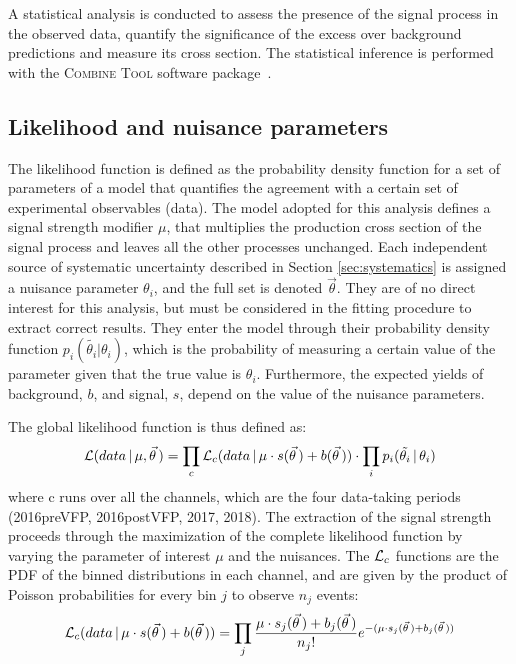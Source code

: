 \label{sec:statistical_analysis}
A statistical analysis is conducted to assess the presence of the signal process in the observed data,
quantify the significance of the excess over background predictions and measure its cross section.
The statistical inference is performed with the \textsc{Combine Tool} software package~\cite{CMS-NOTE-2011-005}.

\subsection{Likelihood and nuisance parameters}
The likelihood function is defined as the probability density function for a set of parameters of a model
that quantifies the agreement with a certain set of experimental observables (data).
The model adopted for this analysis defines a signal strength modifier $\mu$,
that multiplies the production cross section of the signal process and leaves all the other processes unchanged.
Each independent source of systematic uncertainty described in Section \ref{sec:systematics} is assigned a nuisance parameter $\theta_i$, and the full set is denoted $\vec\theta$.
They are of no direct interest for this analysis, but must be considered in the fitting procedure to extract correct results.
They enter the model through their probability density function $p_i(\tilde{\theta_i}|\theta_i)$,
which is the probability of measuring a certain value of the parameter given that the true value is $\theta_i$.
Furthermore, the expected yields of background, $b$, and signal, $s$, depend on the value of the nuisance parameters.

The global likelihood function is thus defined as:
\begin{equation}
  \label{eq:likelihood_full}
  \mathcal{L}(data\, |\, \mu, \vec\theta\,) = \prod_c \mathcal{L}_c(data\, |\, \mu \cdot s(\vec\theta\,) + b(\vec\theta\,)) \cdot \prod_i p_i(\tilde{\theta_i}\, |\, \theta_i)
\end{equation}
where c runs over all the channels, which are the four data-taking periods (2016preVFP, 2016postVFP, 2017, 2018).
The extraction of the signal strength proceeds through the maximization of the complete likelihood function by varying the parameter of interest $\mu$ and the nuisances.
The $\mathcal{L}_c$ functions are the PDF of the binned distributions in each channel, and are given by the product of Poisson probabilities for every bin $j$ to observe $n_j$ events:
\begin{equation}
  \label{eq:likelihood_bin}
  \mathcal{L}_c(data\, |\, \mu \cdot s(\vec\theta\,) + b(\vec\theta\,)) = \prod_j \frac{\mu \cdot s_j(\vec\theta\,) + b_j(\vec\theta\,)}{n_j!} e^{-(\mu \cdot s_j(\vec\theta\,) + b_j(\vec\theta\,))}
\end{equation}

